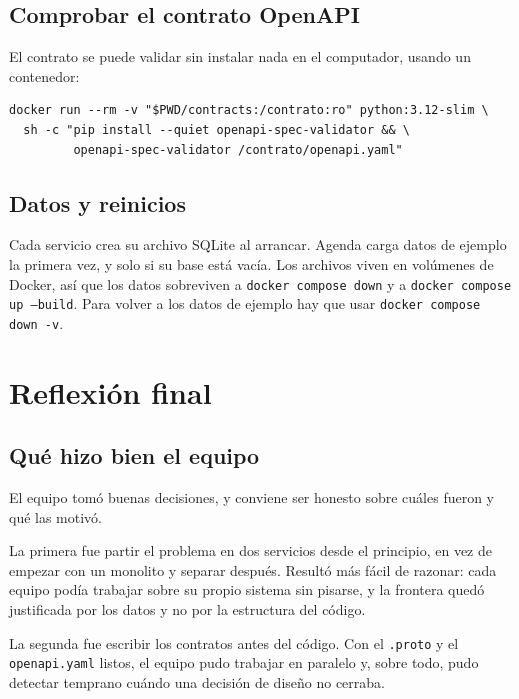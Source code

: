 \documentclass[12pt, a4paper]{article}
\begin{document}
\subsection{Comprobar el contrato OpenAPI}

El contrato se puede validar sin instalar nada en el computador, usando un
contenedor:

\begin{lstlisting}
docker run --rm -v "$PWD/contracts:/contrato:ro" python:3.12-slim \
  sh -c "pip install --quiet openapi-spec-validator && \
         openapi-spec-validator /contrato/openapi.yaml"
\end{lstlisting}

\subsection{Datos y reinicios}

Cada servicio crea su archivo SQLite al arrancar. Agenda carga datos de
ejemplo la primera vez, y solo si su base está vacía. Los archivos viven
en volúmenes de Docker, así que los datos sobreviven a \texttt{docker
compose down} y a \texttt{docker compose up --build}. Para volver a los
datos de ejemplo hay que usar \texttt{docker compose down -v}.


\newpage
\section{Reflexión final}

\subsection{Qué hizo bien el equipo}

El equipo tomó buenas decisiones, y conviene ser honesto sobre cuáles
fueron y qué las motivó.

La primera fue partir el problema en dos servicios desde el principio,
en vez de empezar con un monolito y separar después. Resultó más fácil de
razonar: cada equipo podía trabajar sobre su propio sistema sin pisarse,
y la frontera quedó justificada por los datos y no por la estructura
del código.

La segunda fue escribir los contratos antes del código. Con el
\texttt{.proto} y el \texttt{openapi.yaml} listos, el equipo pudo
trabajar en paralelo y, sobre todo, pudo detectar temprano cuándo una
decisión de diseño no cerraba.
\end{document}
